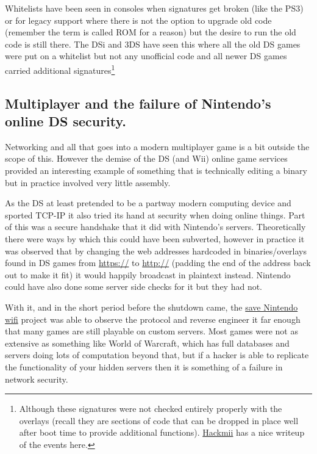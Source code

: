 \documentclass[
]{book}
\begin{document}
Whitelists have been seen in consoles when signatures get broken (like the PS3) or for legacy support where there is not the option to upgrade old code (remember the term is called ROM for a reason) but the desire to run the old code is still there. The DSi and 3DS have seen this where all the old DS games were put on a whitelist but not any unofficial code and all newer DS games carried additional signatures\footnote{Although these signatures were not checked entirely properly with the overlays (recall they are sections of code that can be dropped in place well after boot time to provide additional functions). \href{http://hackmii.com/2010/02/lawsuit-coming-in-3-2-1/}{Hackmii} has a nice writeup of the events here.}

\hypertarget{multiplayer-and-the-failure-of-nintendos-online-ds-security.}{%
\subsection{Multiplayer and the failure of Nintendo's online DS security.}\label{multiplayer-and-the-failure-of-nintendos-online-ds-security.}}

Networking and all that goes into a modern multiplayer game is a bit outside the scope of this. However the demise of the DS (and Wii) online game services provided an interesting example of something that is technically editing a binary but in practice involved very little assembly.

As the DS at least pretended to be a partway modern computing device and sported TCP-IP it also tried its hand at security when doing online things. Part of this was a secure handshake that it did with Nintendo's servers. Theoretically there were ways by which this could have been subverted, however in practice it was observed that by changing the web addresses hardcoded in binaries/overlays found in DS games from \url{https://} to \url{http://} (padding the end of the address back out to make it fit) it would happily broadcast in plaintext instead. Nintendo could have also done some server side checks for it but they had not.

With it, and in the short period before the shutdown came, the \href{http://gbatemp.net/threads/save-nintendo-wifi-a-project-to-save-online-servers-for-ds-and-wii-games.362717/}{save Nintendo wifi} project was able to observe the protocol and reverse engineer it far enough that many games are still playable on custom servers. Most games were not as extensive as something like World of Warcraft, which has full databases and servers doing lots of computation beyond that, but if a hacker is able to replicate the functionality of your hidden servers then it is something of a failure in network security.
\end{document}
